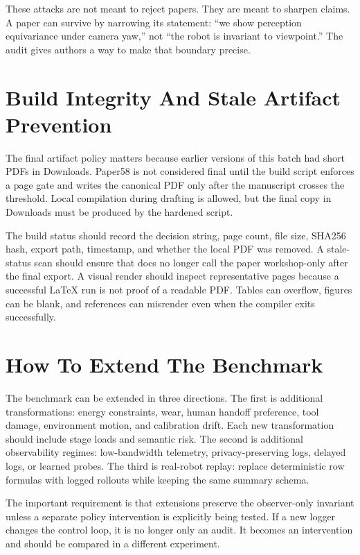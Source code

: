 \documentclass{article}
\begin{document}
These attacks are not meant to reject papers. They are meant to sharpen claims. A paper can survive by narrowing its statement: ``we show perception equivariance under camera yaw,'' not ``the robot is invariant to viewpoint.'' The audit gives authors a way to make that boundary precise.

\section{Build Integrity And Stale Artifact Prevention}

The final artifact policy matters because earlier versions of this batch had short PDFs in Downloads. Paper58 is not considered final until the build script enforces a page gate and writes the canonical PDF only after the manuscript crosses the threshold. Local compilation during drafting is allowed, but the final copy in Downloads must be produced by the hardened script.

The build status should record the decision string, page count, file size, SHA256 hash, export path, timestamp, and whether the local PDF was removed. A stale-status scan should ensure that docs no longer call the paper workshop-only after the final export. A visual render should inspect representative pages because a successful LaTeX run is not proof of a readable PDF. Tables can overflow, figures can be blank, and references can misrender even when the compiler exits successfully.

\section{How To Extend The Benchmark}

The benchmark can be extended in three directions. The first is additional transformations: energy constraints, wear, human handoff preference, tool damage, environment motion, and calibration drift. Each new transformation should include stage loads and semantic risk. The second is additional observability regimes: low-bandwidth telemetry, privacy-preserving logs, delayed logs, or learned probes. The third is real-robot replay: replace deterministic row formulas with logged rollouts while keeping the same summary schema.

The important requirement is that extensions preserve the observer-only invariant unless a separate policy intervention is explicitly being tested. If a new logger changes the control loop, it is no longer only an audit. It becomes an intervention and should be compared in a different experiment.
\end{document}
